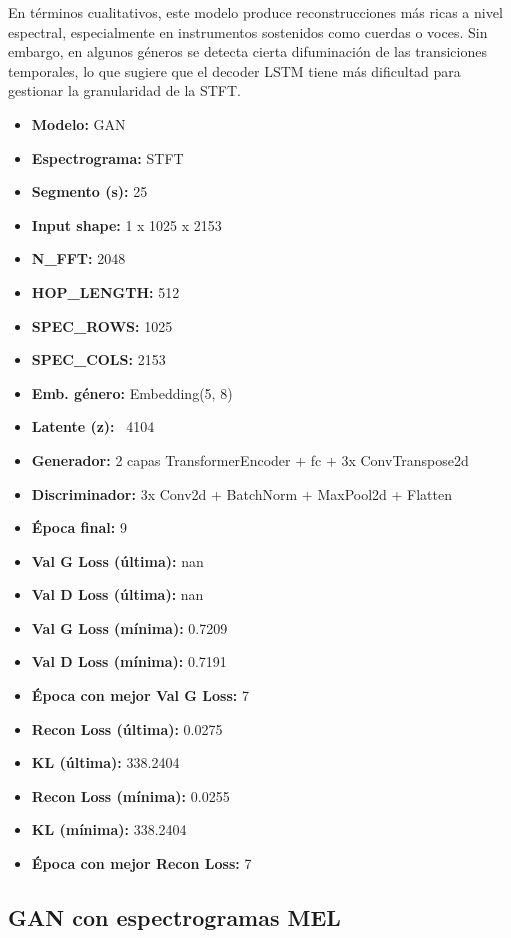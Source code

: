 En términos cualitativos, este modelo produce reconstrucciones más ricas a nivel espectral, especialmente en instrumentos sostenidos como cuerdas o voces. Sin embargo, en algunos géneros se detecta cierta difuminación de las transiciones temporales, lo que sugiere que el decoder LSTM tiene más dificultad para gestionar la granularidad de la STFT.

\begin{itemize}
  \item \textbf{Modelo:} GAN
  \item \textbf{Espectrograma:} STFT
  \item \textbf{Segmento (s):} 25
  \item \textbf{Input shape:} 1 x 1025 x 2153
  \item \textbf{N\_FFT:} 2048
  \item \textbf{HOP\_LENGTH:} 512
  \item \textbf{SPEC\_ROWS:} 1025
  \item \textbf{SPEC\_COLS:} 2153
  \item \textbf{Emb. género:} Embedding(5, 8)
  \item \textbf{Latente (z):} ~4104
  \item \textbf{Generador:} 2 capas TransformerEncoder + fc + 3x ConvTranspose2d
  \item \textbf{Discriminador:} 3x Conv2d + BatchNorm + MaxPool2d + Flatten
  \item \textbf{Época final:} 9
  \item \textbf{Val G Loss (última):} nan
  \item \textbf{Val D Loss (última):} nan
  \item \textbf{Val G Loss (mínima):} 0.7209
  \item \textbf{Val D Loss (mínima):} 0.7191
  \item \textbf{Época con mejor Val G Loss:} 7
  \item \textbf{Recon Loss (última):} 0.0275
  \item \textbf{KL (última):} 338.2404
  \item \textbf{Recon Loss (mínima):} 0.0255
  \item \textbf{KL (mínima):} 338.2404
  \item \textbf{Época con mejor Recon Loss:} 7
\end{itemize}

\subsection{GAN con espectrogramas MEL}

